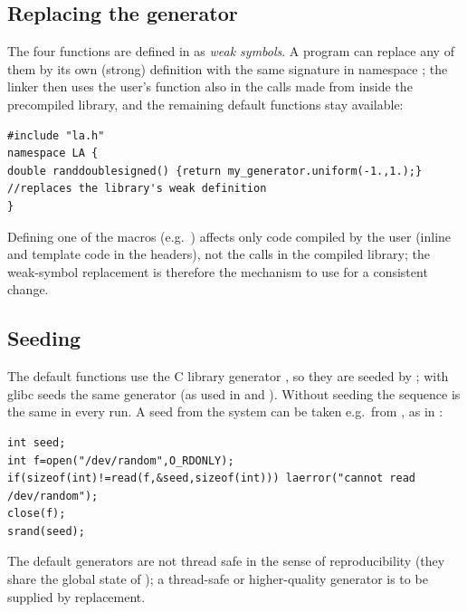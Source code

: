 \begin{lareference}
\lafunc{double randdouble()}{Uniform in $[0,1)$: \code{random()/(1.+RAND_MAX)}.}
\lafunc{double randdoublesigned()}{Uniform in $[-1,1)$: \code{2.*random()/(1.+RAND_MAX)-1.}.}
\end{lareference}

\subsection{Replacing the generator}
The four functions are defined in  as \emph{weak symbols}. A program can replace any of them by its own
(strong) definition with the same signature in namespace ; the linker then uses the user's function also in the
calls made from inside the precompiled library, and the remaining default functions stay available:
\begin{lstlisting}
#include "la.h"
namespace LA {
double randdoublesigned() {return my_generator.uniform(-1.,1.);}   //replaces the library's weak definition
}
\end{lstlisting}
Defining one of the macros (e.g.\ ) affects only code compiled by the user (inline and
template code in the headers), not the calls in the compiled library; the weak-symbol replacement is therefore the
mechanism to use for a consistent change.

\subsection{Seeding}
The default functions use the C library generator , so they are seeded by ; with glibc
 seeds the same generator (as used in  and ). Without seeding the sequence
is the same in every run. A seed from the system can be taken e.g.\ from , as in :
\begin{lstlisting}
int seed;
int f=open("/dev/random",O_RDONLY);
if(sizeof(int)!=read(f,&seed,sizeof(int))) laerror("cannot read /dev/random");
close(f);
srand(seed);
\end{lstlisting}
The default generators are not thread safe in the sense of reproducibility (they share the global state of
); a thread-safe or higher-quality generator is to be supplied by replacement.

